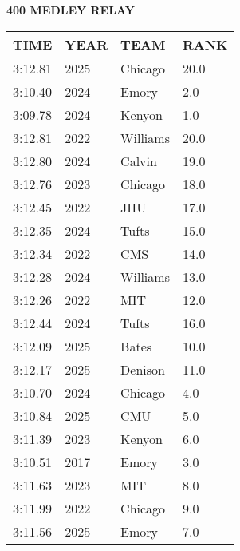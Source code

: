 \begin{table}[H]
\centering
\begin{minipage}[t]{0.6\textwidth}
\centering
\textbf{400 MEDLEY RELAY}\\[0.1cm]
\begin{tabular}{@{}p{1.8cm}p{1.2cm}p{1.4cm}p{0.8cm}@{}}
\hline
    \textbf{TIME} & \textbf{YEAR} & \textbf{TEAM} & \textbf{RANK} \\
\hline
    3:12.81 & 2025 & Chicago & 20.0 \\
    3:10.40 & 2024 & Emory & 2.0 \\
    3:09.78 & 2024 & Kenyon & 1.0 \\
    3:12.81 & 2022 & Williams & 20.0 \\
    3:12.80 & 2024 & Calvin & 19.0 \\
    3:12.76 & 2023 & Chicago & 18.0 \\
    3:12.45 & 2022 & JHU & 17.0 \\
    3:12.35 & 2024 & Tufts & 15.0 \\
    3:12.34 & 2022 & CMS & 14.0 \\
    3:12.28 & 2024 & Williams & 13.0 \\
    3:12.26 & 2022 & MIT & 12.0 \\
    3:12.44 & 2024 & Tufts & 16.0 \\
    3:12.09 & 2025 & Bates & 10.0 \\
    3:12.17 & 2025 & Denison & 11.0 \\
    3:10.70 & 2024 & Chicago & 4.0 \\
    3:10.84 & 2025 & CMU & 5.0 \\
    3:11.39 & 2023 & Kenyon & 6.0 \\
    3:10.51 & 2017 & Emory & 3.0 \\
    3:11.63 & 2023 & MIT & 8.0 \\
    3:11.99 & 2022 & Chicago & 9.0 \\
    3:11.56 & 2025 & Emory & 7.0 \\
\hline
\end{tabular}
\end{minipage}
\end{table}

